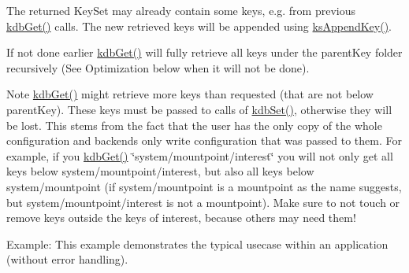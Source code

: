 The {\ttfamily returned} Key\+Set may already contain some keys, e.\+g. from previous \hyperlink{group__kdb_ga28e385fd9cb7ccfe0b2f1ed2f62453a1}{kdb\+Get()} calls. The new retrieved keys will be appended using \hyperlink{group__keyset_gaa5a1d467a4d71041edce68ea7748ce45}{ks\+Append\+Key()}.

If not done earlier \hyperlink{group__kdb_ga28e385fd9cb7ccfe0b2f1ed2f62453a1}{kdb\+Get()} will fully retrieve all keys under the {\ttfamily parent\+Key} folder recursively (See Optimization below when it will not be done).

\begin{DoxyNote}{Note}
\hyperlink{group__kdb_ga28e385fd9cb7ccfe0b2f1ed2f62453a1}{kdb\+Get()} might retrieve more keys than requested (that are not below parent\+Key). These keys must be passed to calls of \hyperlink{group__kdb_ga11436b058408f83d303ca5e996832bcf}{kdb\+Set()}, otherwise they will be lost. This stems from the fact that the user has the only copy of the whole configuration and backends only write configuration that was passed to them. For example, if you \hyperlink{group__kdb_ga28e385fd9cb7ccfe0b2f1ed2f62453a1}{kdb\+Get()} \char`\"{}system/mountpoint/interest\char`\"{} you will not only get all keys below system/mountpoint/interest, but also all keys below system/mountpoint (if system/mountpoint is a mountpoint as the name suggests, but system/mountpoint/interest is not a mountpoint). Make sure to not touch or remove keys outside the keys of interest, because others may need them!
\end{DoxyNote}
\begin{DoxyParagraph}{Example\+:}
This example demonstrates the typical usecase within an application (without error handling).
\end{DoxyParagraph}

